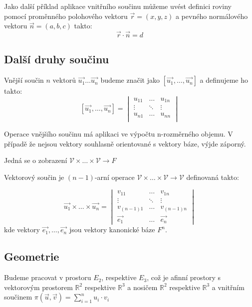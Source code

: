 Jako další příklad aplikace vnitřního součinu můžeme uvést definici roviny pomocí
proměnného polohového vektoru $\vec{r} = (x, y, z)$ a pevného normálového vektoru
$\vec{n} = (a, b, c)$ takto:
$$\vec{r} \cdot \vec{n} = d$$

\subsection{Další druhy součinu}
\begin{definition}
    Vnější součin $n$ vektorů $\vec{u_1} \ldots \vec{u_n}$ budeme značit jako
    $[\vec{u_1}, \ldots, \vec{u_n}]$ a definujeme ho takto:
    \[
        [\vec{u_1}, \ldots, \vec{u_n}] =
        \begin{vmatrix}
            u_{11} & \ldots & u_{1n}\\
            \vdots & \ddots & \vdots\\
            u_{n1} & \ldots & u_{nn}\\
        \end{vmatrix}
    \]

    Operace vnějšího součinu má aplikaci ve výpočtu n-rozměrného objemu. V případě
    že nejsou vektory souhlasně orientované s vektory báze, výjde záporný.

    Jedná se o zobrazení $\mathcal{V} \times \ldots \times \mathcal{V} \rightarrow F$
\end{definition}

\begin{definition}
    Vektorový součin je $(n-1)$-arní operace $\mathcal{V} \times \ldots \times \mathcal{V}
    \rightarrow \mathcal{V}$ definovaná takto:

    \[
      \vec{u_1} \times \ldots \times \vec{u_n} =
      \begin{vmatrix}
        v_{11} & \ldots & v_{1n} \\
        \vdots & \ddots & \vdots \\
        v_{(n-1)1} & \ldots & v_{(n-1)n} \\
        \vec{e_1} & \ldots & \vec{e_n}
      \end{vmatrix}
    \]
    kde vektory $\vec{e_1}, \ldots, \vec{e_n}$ jsou vektory kanonické báze $F^n$.
\end{definition}


\subsection{Geometrie}
Budeme pracovat v prostoru $E_2$, respektive $E_3$, což je afinní prostory
s vektorovým prostorem $\mathbb{R}^2$ respektive $\mathbb{R}^3$ a nosičem
$\mathbb{R}^2$ respektive $\mathbb{R}^3$ a vnitřním součinem
$\pi(\vec{u}, \vec{v}) = \sum_{i=1}^n u_i \cdot v_i$

